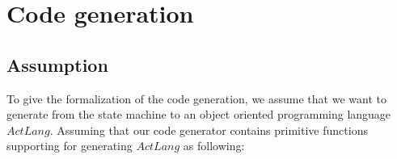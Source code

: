 \section{Code generation}


\subsection{Assumption}
To give the formalization of the code generation, we assume that we want to generate from the state machine to an object oriented programming language $ActLang$. Assuming that our code generator contains primitive functions supporting for generating $ActLang$ as following:
